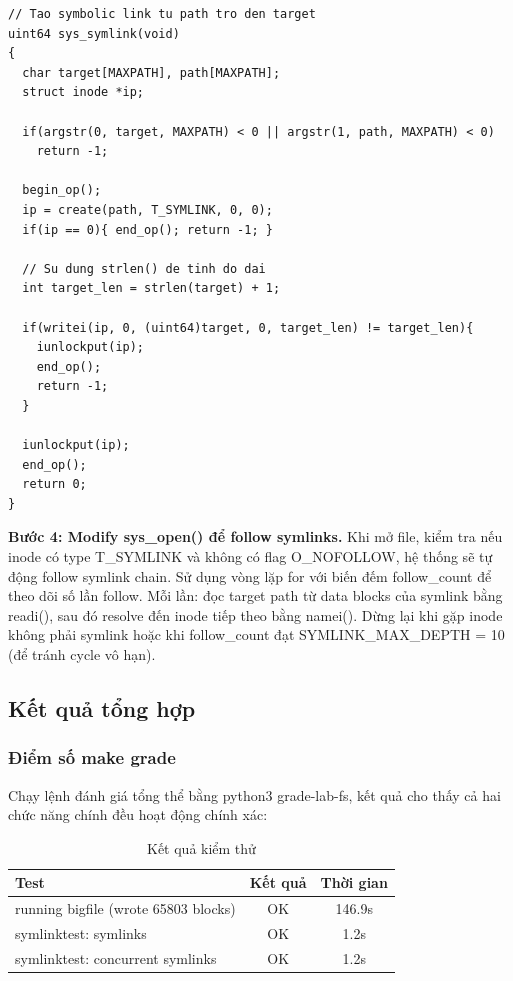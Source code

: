 \documentclass[12pt,a4paper]{article}
\begin{document}
\begin{lstlisting}[caption={Cài đặt sys\_symlink()}]
// Tao symbolic link tu path tro den target
uint64 sys_symlink(void)
{
  char target[MAXPATH], path[MAXPATH];
  struct inode *ip;

  if(argstr(0, target, MAXPATH) < 0 || argstr(1, path, MAXPATH) < 0)
    return -1;

  begin_op();
  ip = create(path, T_SYMLINK, 0, 0);
  if(ip == 0){ end_op(); return -1; }

  // Su dung strlen() de tinh do dai
  int target_len = strlen(target) + 1;
  
  if(writei(ip, 0, (uint64)target, 0, target_len) != target_len){
    iunlockput(ip);
    end_op();
    return -1;
  }

  iunlockput(ip);
  end_op();
  return 0;
}
\end{lstlisting}

\textbf{Bước 4: Modify sys\_open() để follow symlinks.} Khi mở file, kiểm tra nếu inode có type T\_SYMLINK và không có flag O\_NOFOLLOW, hệ thống sẽ tự động follow symlink chain. Sử dụng vòng lặp for với biến đếm follow\_count để theo dõi số lần follow. Mỗi lần: đọc target path từ data blocks của symlink bằng readi(), sau đó resolve đến inode tiếp theo bằng namei(). Dừng lại khi gặp inode không phải symlink hoặc khi follow\_count đạt SYMLINK\_MAX\_DEPTH = 10 (để tránh cycle vô hạn).

\subsection{Kết quả tổng hợp}

\subsubsection{Điểm số make grade}

Chạy lệnh đánh giá tổng thể bằng python3 grade-lab-fs, kết quả cho thấy cả hai chức năng chính đều hoạt động chính xác:

\begin{table}[H]
\centering
\caption{Kết quả kiểm thử}
\begin{tabular}{|l|c|c|}
\hline
\textbf{Test} & \textbf{Kết quả} & \textbf{Thời gian} \\
\hline
running bigfile (wrote 65803 blocks) & OK & 146.9s \\
\hline
symlinktest: symlinks & OK & 1.2s \\
\hline
symlinktest: concurrent symlinks & OK & 1.2s \\
\hline
\end{tabular}
\end{table}
\end{document}
